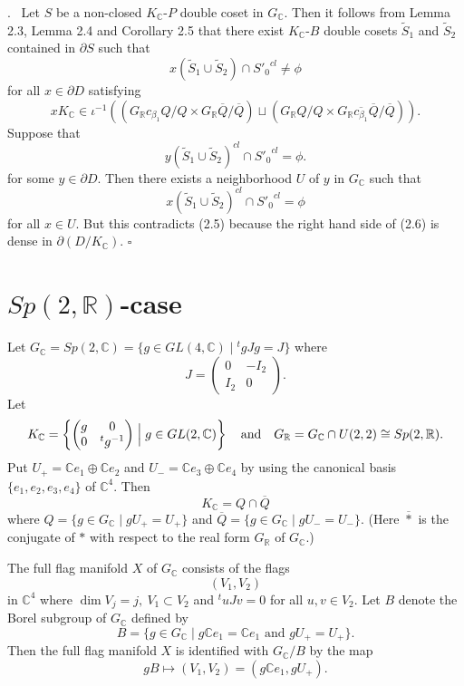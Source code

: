 \documentclass[12pt,a4paper]{amsart}
\theoremstyle{definition}
\theoremstyle{remark}
\numberwithin{equation}{section}
\def\br{\mathbb R}
\def\bc{\mathbb C}
\def\mand{\quad\mbox{and}\quad}
\def\p{\partial}
\def\bp{\begin{pmatrix}}
\def\ep{\end{pmatrix}}
\begin{document}
. \ Let $S$ be a non-closed $K_\bc$-$P$ double coset in $G_\bc$. Then it follows from Lemma 2.3, Lemma 2.4 and Corollary 2.5 that there exist $K_\bc$-$B$ double cosets $\widetilde{S}_1$ and $\widetilde{S}_2$ contained in $\p S$ such that
\begin{equation}
x(\widetilde{S}_1\cup \widetilde{S}_2)\cap {S'_0}^{cl}\ne\phi \tag{2.5}
\end{equation}
for all $x\in\p D$ satisfying
\begin{equation}
xK_\bc \in \iota^{-1}((G_\br c_{\beta_1}Q/Q\times G_\br\overline{Q}/\overline{Q}) \sqcup (G_\br Q/Q\times G_\br\overline{c_{\beta_1}}\overline{Q}/\overline{Q})). \tag{2.6}
\end{equation}
Suppose that
$$y(\widetilde{S}_1\cup \widetilde{S}_2)^{cl}\cap {S'_0}^{cl}=\phi.$$
for some $y\in\p D$. Then there exists a neighborhood $U$ of $y$ in $G_\bc$ such that
$$x(\widetilde{S}_1\cup \widetilde{S}_2)^{cl}\cap {S'_0}^{cl}=\phi$$
for all $x\in U$. But this contradicts (2.5) because the right hand side of (2.6) is dense in $\p(D/K_\bc)$. \hfill $\square$

\section{$Sp(2,\br)$-case}

Let $G_\bc=Sp(2,\bc)=\{g\in GL(4,\bc)\mid {}^tgJg=J\}$ where
$$J=\bp 0 & -I_2 \\ I_2 & 0 \ep.$$
Let
$$K_\bc=\left\{\bp g & 0 \\ 0 & {}^tg^{-1} \ep\Bigm| g\in GL(2,\bc)\right\}
\mand
G_\br=G_\bc\cap U(2,2)\cong Sp(2,\br).$$
Put $U_+=\bc e_1\oplus\bc e_2$ and $U_-=\bc e_3\oplus\bc e_4$ by using the canonical basis $\{e_1,e_2,e_3,e_4\}$ of $\bc^4$. Then
$$K_\bc=Q\cap\overline{Q}$$
where $Q=\{g\in G_\bc\mid gU_+=U_+\}$ and $\overline{Q}=\{g\in G_\bc\mid gU_-=U_-\}$. (Here $\overline{*}$ is the conjugate of $*$ with respect to the real form $G_\br$ of $G_\bc$.)

The full flag manifold $X$ of $G_\bc$ consists of the flags
$$(V_1,V_2)$$
in $\bc^4$ where $\dim V_j=j, \ V_1\subset V_2$ and ${}^tuJv=0$ for all $u,v\in V_2$. Let $B$ denote the Borel subgroup of $G_\bc$ defined by
$$B=\{g\in G_\bc\mid g\bc e_1=\bc e_1\mbox{ and }gU_+=U_+\}.$$
Then the full flag manifold $X$ is identified with $G_\bc/B$ by the map
$$gB\mapsto (V_1,V_2)=(g\bc e_1,gU_+).$$
\end{document}

